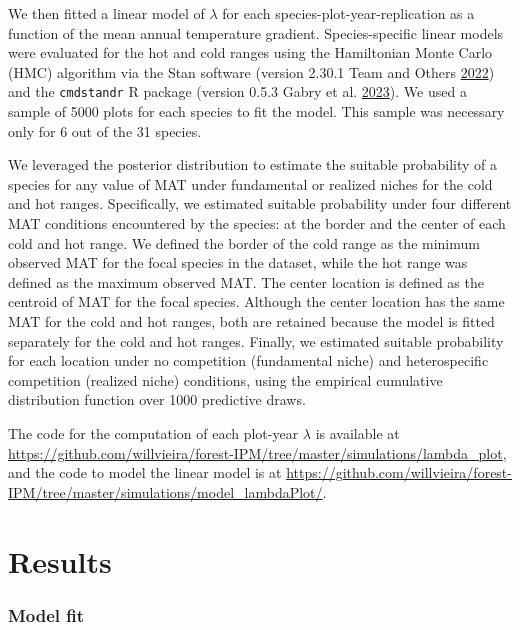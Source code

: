 \documentclass[12pt]{article}
\begin{document}
We then fitted a linear model of \(\lambda\) for each
species-plot-year-replication as a function of the mean annual
temperature gradient. Species-specific linear models were evaluated for
the hot and cold ranges using the Hamiltonian Monte Carlo (HMC)
algorithm via the Stan software (version 2.30.1 Team and Others
\protect\hyperlink{ref-stan2022stan}{2022}) and the \texttt{cmdstandr} R
package (version 0.5.3 Gabry et al.
\protect\hyperlink{ref-cmdstanr}{2023}). We used a sample of 5000 plots
for each species to fit the model. This sample was necessary only for 6
out of the 31 species.

We leveraged the posterior distribution to estimate the suitable
probability of a species for any value of MAT under fundamental or
realized niches for the cold and hot ranges. Specifically, we estimated
suitable probability under four different MAT conditions encountered by
the species: at the border and the center of each cold and hot range. We
defined the border of the cold range as the minimum observed MAT for the
focal species in the dataset, while the hot range was defined as the
maximum observed MAT. The center location is defined as the centroid of
MAT for the focal species. Although the center location has the same MAT
for the cold and hot ranges, both are retained because the model is
fitted separately for the cold and hot ranges. Finally, we estimated
suitable probability for each location under no competition (fundamental
niche) and heterospecific competition (realized niche) conditions, using
the empirical cumulative distribution function over 1000 predictive
draws.

The code for the computation of each plot-year \(\lambda\) is available
at
\url{https://github.com/willvieira/forest-IPM/tree/master/simulations/lambda_plot},
and the code to model the linear model is at
\url{https://github.com/willvieira/forest-IPM/tree/master/simulations/model_lambdaPlot/}.

\hypertarget{results}{%
\section{Results}\label{results}}

\hypertarget{model-fit}{%
\subsubsection{Model fit}\label{model-fit}}
\end{document}
